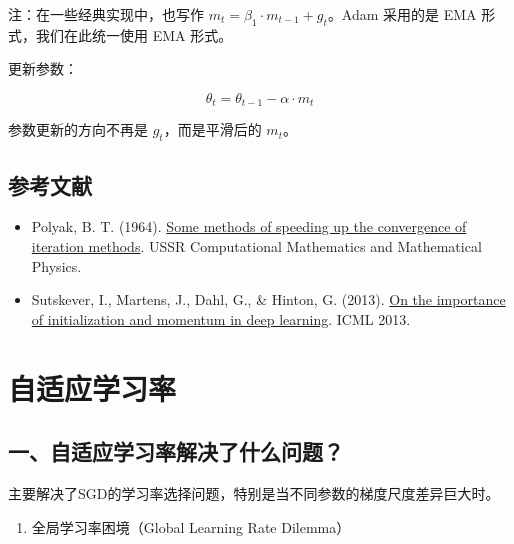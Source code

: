 注：在一些经典实现中，也写作 \(m_t=\beta_1\cdot m_{t-1}+g_t\)。Adam 采用的是 EMA 形式，我们在此统一使用 EMA 形式。

更新参数：

\[
\theta_t = \theta_{t-1} - \alpha \cdot m_t
\]

参数更新的方向不再是 \(g_t\)，而是平滑后的 \(m_t\)。

\hypertarget{ux53c2ux8003ux6587ux732e-26}{%
\subsection{参考文献}\label{ux53c2ux8003ux6587ux732e-26}}

\vspace{0.25em}
\begin{itemize}
\tightlist
\item
  Polyak, B. T. (1964). \href{https://doi.org/10.1016/0041-5553(64)90137-5}{Some methods of speeding up the convergence of iteration methods}. USSR Computational Mathematics and Mathematical Physics.
\item
  Sutskever, I., Martens, J., Dahl, G., \& Hinton, G. (2013). \href{https://proceedings.mlr.press/v28/sutskever13.html}{On the importance of initialization and momentum in deep learning}. ICML 2013.
\end{itemize}

\clearpage

\hypertarget{ux81eaux9002ux5e94ux5b66ux4e60ux7387}{%
\section{自适应学习率}\label{ux81eaux9002ux5e94ux5b66ux4e60ux7387}}

\hypertarget{ux4e00ux81eaux9002ux5e94ux5b66ux4e60ux7387ux89e3ux51b3ux4e86ux4ec0ux4e48ux95eeux9898}{%
\subsection{一、自适应学习率解决了什么问题？}\label{ux4e00ux81eaux9002ux5e94ux5b66ux4e60ux7387ux89e3ux51b3ux4e86ux4ec0ux4e48ux95eeux9898}}

主要解决了SGD的学习率选择问题，特别是当不同参数的梯度尺度差异巨大时。

\begin{enumerate}
\def\labelenumi{\arabic{enumi}.}
\tightlist
\item
  全局学习率困境（Global Learning Rate Dilemma）
\end{enumerate}

